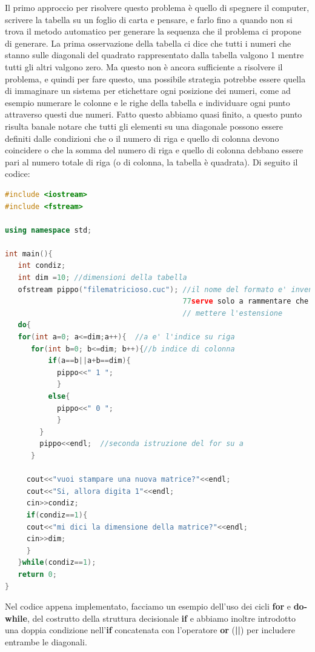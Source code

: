 \documentclass[11pt,fleqn]{book} %
\begin{document}
Il primo approccio per risolvere questo problema è quello di spegnere il computer, 
scrivere la tabella su un foglio di carta e pensare, e farlo fino a quando non si trova il metodo automatico per generare la sequenza che il problema ci propone di generare. 
La prima osservazione della tabella ci dice che tutti i numeri che stanno sulle diagonali del quadrato rappresentato dalla tabella valgono 1 mentre tutti gli altri valgono zero. Ma questo non è ancora sufficiente a risolvere il problema,
e quindi per fare questo, una possibile strategia potrebbe essere quella di immaginare un sistema per etichettare ogni posizione dei numeri, come ad esempio numerare le colonne e le righe della tabella e individuare ogni punto attraverso questi due numeri. Fatto questo abbiamo quasi finito, a questo punto risulta banale notare che tutti gli elementi su una diagonale possono essere definiti dalle condizioni che o il numero di riga e quello di colonna devono coincidere o che la somma del numero di riga e quello di colonna debbano essere pari al numero totale di riga (o di colonna, la tabella è quadrata).  Di seguito il codice:

\begin{lstlisting}[language=c++]
#include <iostream>
#include <fstream>

using namespace std;

int main(){
   int condiz;
   int dim =10; //dimensioni della tabella
   ofstream pippo("filematricioso.cuc"); //il nome del formato e' inventato
                                         77serve solo a rammentare che e' bene
                                         // mettere l'estensione
   do{
   for(int a=0; a<=dim;a++){  //a e' l'indice su riga
      for(int b=0; b<=dim; b++){//b indice di colonna
          if(a==b||a+b==dim){
            pippo<<" 1 ";
            }
          else{
            pippo<<" 0 ";
            }
        }
        pippo<<endl;  //seconda istruzione del for su a 
      }

     cout<<"vuoi stampare una nuova matrice?"<<endl;
     cout<<"Si, allora digita 1"<<endl;
     cin>>condiz;
     if(condiz==1){
     cout<<"mi dici la dimensione della matrice?"<<endl;
     cin>>dim;
     }
   }while(condiz==1);
   return 0;
}
\end{lstlisting} 

Nel codice appena implementato, facciamo un esempio dell'uso dei cicli \textbf{for} e \textbf{do-while}, del costrutto della struttura decisionale \textbf{if} e abbiamo
inoltre introdotto una doppia condizione nell'\textbf{if} concatenata con l'operatore \textbf{or} (\textbf{||}) per includere entrambe le diagonali.
\end{document}
